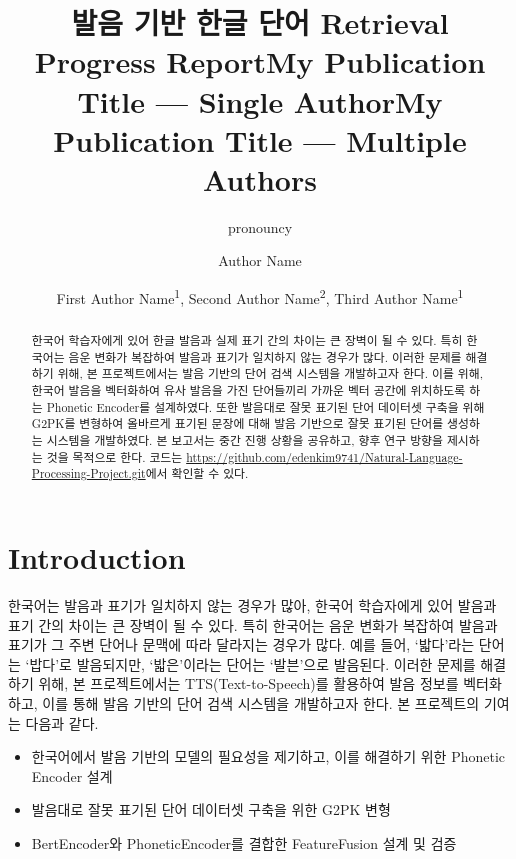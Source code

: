 \documentclass[letterpaper]{article} %
\title{발음 기반 한글 단어 Retrieval \\
        Progress Report}
\author{
    pronouncy
}
\title{My Publication Title --- Single Author}
\author {
    Author Name
}
\title{My Publication Title --- Multiple Authors}
\author {
    First Author Name\textsuperscript{\rm 1},
    Second Author Name\textsuperscript{\rm 2},
    Third Author Name\textsuperscript{\rm 1}
}
\begin{document}
\maketitle

\begin{abstract}
한국어 학습자에게 있어 한글 발음과 실제 표기 간의 차이는 큰 장벽이 될 수 있다. 
특히 한국어는 음운 변화가 복잡하여 발음과 표기가 일치하지 않는 경우가 많다. 이러한 문제를 해결하기 위해, 본 프로젝트에서는 발음 기반의 단어 검색 시스템을 개발하고자 한다. 
이를 위해, 한국어 발음을 벡터화하여 유사 발음을 가진 단어들끼리 가까운 벡터 공간에 위치하도록 하는 Phonetic Encoder를 설계하였다. 
또한 발음대로 잘못 표기된 단어 데이터셋 구축을 위해 G2PK\cite{park2019g2pk}를 변형하여 올바르게 표기된 문장에 대해 발음 기반으로 잘못 표기된 단어를 생성하는 시스템을 개발하였다.
본 보고서는 중간 진행 상황을 공유하고, 향후 연구 방향을 제시하는 것을 목적으로 한다. 코드는 \url{https://github.com/edenkim9741/Natural-Language-Processing-Project.git}에서 확인할 수 있다.
\end{abstract}

%

\section{Introduction}
한국어는 발음과 표기가 일치하지 않는 경우가 많아, 한국어 학습자에게 있어 발음과 표기 간의 차이는 큰 장벽이 될 수 있다.
특히 한국어는 음운 변화가 복잡하여 발음과 표기가 그 주변 단어나 문맥에 따라 달라지는 경우가 많다. 예를 들어, `밟다'라는 단어는 `밥다'로 발음되지만, `밟은'이라는 단어는 `발븐'으로 발음된다. 이러한 문제를 해결하기 위해, 본 프로젝트에서는 TTS(Text-to-Speech)를 활용하여 발음 정보를 벡터화하고, 이를 통해 발음 기반의 단어 검색 시스템을 개발하고자 한다.
본 프로젝트의 기여는 다음과 같다.
\begin{itemize}
    \item 한국어에서 발음 기반의 모델의 필요성을 제기하고, 이를 해결하기 위한 Phonetic Encoder 설계
    \item 발음대로 잘못 표기된 단어 데이터셋 구축을 위한 G2PK 변형
    \item BertEncoder와 PhoneticEncoder를 결합한 FeatureFusion 설계 및 검증
\end{itemize}
\end{document}
